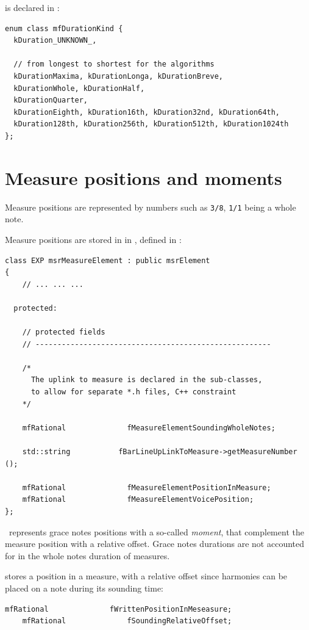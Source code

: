  is declared in :
\begin{lstlisting}[language=CPlusPlus]
enum class mfDurationKind {
  kDuration_UNKNOWN_,

  // from longest to shortest for the algorithms
  kDurationMaxima, kDurationLonga, kDurationBreve,
  kDurationWhole, kDurationHalf,
  kDurationQuarter,
  kDurationEighth, kDuration16th, kDuration32nd, kDuration64th,
  kDuration128th, kDuration256th, kDuration512th, kDuration1024th
};
\end{lstlisting}

\section{Measure positions and moments}\label{Measure positions and moments}

Measure positions are represented by  numbers such as {\tt 3/8}, {\tt 1/1} being a whole note.

Measure positions are stored in  in , defined in :
\begin{lstlisting}[language=CPlusPlus]
class EXP msrMeasureElement : public msrElement
{
	// ... ... ...

  protected:

    // protected fields
    // ------------------------------------------------------

    /*
      The uplink to measure is declared in the sub-classes,
      to allow for separate *.h files, C++ constraint
    */

    mfRational              fMeasureElementSoundingWholeNotes;

    std::string           fBarLineUpLinkToMeasure->getMeasureNumber ();

    mfRational              fMeasureElementPositionInMeasure;
    mfRational              fMeasureElementVoicePosition;
};
\end{lstlisting}

\lily\ represents grace notes positions with a so-called {\it moment}, that complement the measure position with a relative offset. Grace notes durations are not accounted for in the whole notes duration of measures.

 stores a position in a measure, with a relative offset since harmonies can be placed on a note during its sounding time:
\begin{lstlisting}[language=CPlusPlus]
    mfRational              fWrittenPositionInMeseasure;
    mfRational              fSoundingRelativeOffset;
\end{lstlisting}


